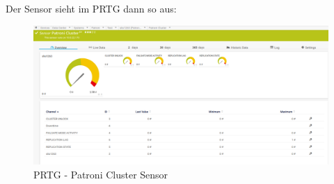 \begin{flushleft}
    Der Sensor sieht im \Gls{PRTG} dann so aus:
    \begin{figure}[H]
        \centering
        \includegraphics[width=1\linewidth]{source/implementation/construction_implementation/monitoring/patroni_cluster_sensor}
        \caption{\Gls{PRTG} - Patroni Cluster Sensor}
        \label{fig:patroni_cluster_sensor}
    \end{figure}
\end{flushleft}